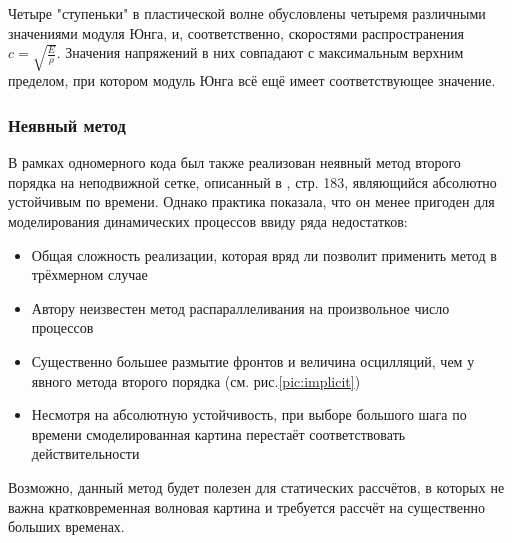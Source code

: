 Четыре "ступеньки" в пластической волне обусловлены четыремя различными значениями модуля Юнга, и, соответственно, скоростями распространения $c = \sqrt{\frac{E}{\rho}}$. Значения напряжений в них совпадают с максимальным верхним пределом, при котором модуль Юнга всё ещё имеет соответствующее значение.

\subsubsection{Неявный метод}
В рамках одномерного кода был также реализован неявный метод второго порядка на неподвижной сетке, описанный в \cite{kukudganov}, стр. 183, являющийся абсолютно устойчивым по времени. Однако практика показала, что он менее пригоден для моделирования динамических процессов ввиду ряда недостатков:
\begin{itemize}
\item Общая сложность реализации, которая вряд ли позволит применить метод в трёхмерном случае
\item Автору неизвестен метод распараллеливания на произвольное число процессов
\item Существенно большее размытие фронтов и величина осцилляций, чем у явного метода второго порядка (см. рис.\ref{pic:implicit})
\item Несмотря на абсолютную устойчивость, при выборе большого шага по времени смоделированная картина перестаёт соответствовать действительности
\end{itemize}
Возможно, данный метод будет полезен для статических рассчётов, в которых не важна кратковременная волновая картина и требуется рассчёт на существенно больших временах.

